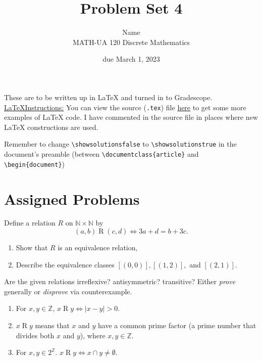 \documentclass{article}
\title{Problem Set 4}
\author{%
    Name
\\  MATH-UA 120 Discrete Mathematics
}
\date{due March 1, 2023}
\newif\ifshowsolutions
\newcommand{\danger}{\marginpar[\hfill\dbend]{\dbend\hfill}}
\newcommand{\Z}{\mathbb{Z}}
\theoremstyle{definition}
\begin{document}
\maketitle



These are to be written up in \LaTeX{} and turned in to Gradescope.\\



\ifshowsolutions
    \SetupExSheets{solution/print=true}
\else
    \danger
 \underline{ \LaTeX  Instructions:}  You can view the source (\texttt{.tex}) file \href{}{here} to get some more examples of \LaTeX{} code.  I have commented in the source file in places where new \LaTeX{} constructions are used.
  
  Remember to change \verb|\showsolutionsfalse| to \verb|\showsolutionstrue|
    in the document's preamble 
    (between \verb|\documentclass{article}| and \verb|\begin{document}|)
\fi

\section*{Assigned Problems}


\begin{question}{7}
    Define a relation $R$ on $\mathbb{N}\times \mathbb{N}$ by
	\[
	(a, b)\mathrel{R}(c, d) \iff 3a+d = b+3c.
	\]
	\begin{enumerate}
	\item Show that $R$ is an equivalence relation, 
	\item Describe the equivalence classes $[(0, 0)], [(1, 2)],$ and $[(2, 1)]$.
	\end{enumerate}
\end{question}
\begin{solution}
\end{solution}


\begin{question}{9}
    Are the given relations irreflexive? antisymmetric? transitive? Either \textit{prove} generally or \textit{disprove} via 
    counterexample.
    	\begin{enumerate}
	\item For $x, y \in \Z$,  $x\mathrel{R}y \iff |x - y| > 0$. 
	\item  $x\mathrel{R}y$ means that $x$ and $y$ have a common prime factor (a prime number that divides both $x$ and $y$), 
	where $x, y \in \Z$.
	\item For $x, y \in 2^{\Z}$. $x\mathrel{R}y \iff x \cap y \neq \emptyset$.
	\end{enumerate}
\end{question}
\begin{solution}
\end{solution}
\end{document}
